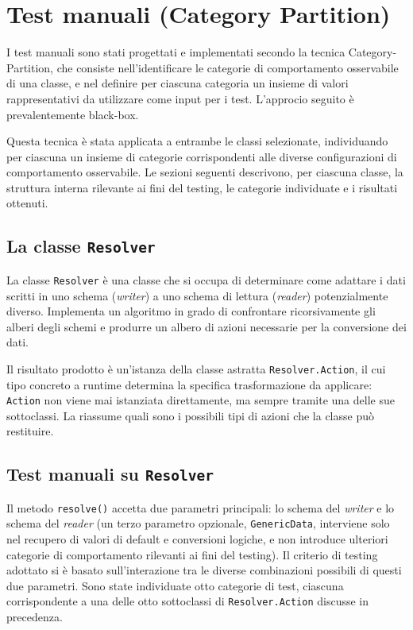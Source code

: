 \section{Test manuali (Category Partition)}

I test manuali sono stati progettati e implementati secondo la tecnica
Category-Partition, che consiste nell'identificare le categorie di
comportamento osservabile di una classe, e nel definire per ciascuna
categoria un insieme di valori rappresentativi da
utilizzare come input per i test. L'approcio seguito è
prevalentemente black-box.



Questa tecnica è stata applicata a entrambe le classi selezionate,
individuando per ciascuna un insieme di categorie corrispondenti alle
diverse configurazioni di comportamento osservabile. Le sezioni
seguenti descrivono, per ciascuna classe, la struttura interna
rilevante ai fini del testing, le categorie individuate e i risultati
ottenuti.

\subsection{La classe \texttt{Resolver}}
La classe \texttt{Resolver} è una classe che si occupa di determinare
come adattare i dati scritti in uno schema (\emph{writer}) a uno schema
di lettura (\emph{reader}) potenzialmente diverso. Implementa un
algoritmo in grado di confrontare ricorsivamente gli alberi degli schemi
e produrre un albero di azioni necessarie per la conversione dei dati.

Il risultato prodotto è un'istanza della classe astratta
\texttt{Resolver.Action}, il cui tipo concreto a runtime determina la
specifica trasformazione da applicare: \texttt{Action} non viene mai
istanziata direttamente, ma sempre tramite una delle sue sottoclassi.
La  riassume quali sono i
possibili tipi di azioni che la classe può restituire.

\subsection{Test manuali su \texttt{Resolver}}

Il metodo \texttt{resolve()} accetta due parametri principali:
lo schema del \emph{writer} e lo schema del \emph{reader} (un terzo
parametro opzionale, \texttt{GenericData}, interviene solo nel recupero
di valori di default e conversioni logiche, e non introduce ulteriori
categorie di comportamento rilevanti ai fini del testing). Il criterio
di testing adottato si è basato sull'interazione tra le diverse
combinazioni possibili di questi due parametri. Sono state individuate
otto categorie di test, ciascuna corrispondente a una delle otto
sottoclassi di \texttt{Resolver.Action} discusse in precedenza.

